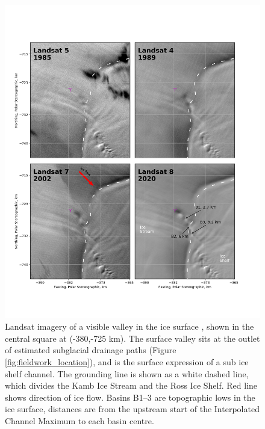 \begin{figure}[!ht]
\centering
\includegraphics[width=1\textwidth]{chapters/2/historic_channel.png}
\caption[Historic Landsat imagery]{Landsat imagery of a visible valley in the ice surface \citep{RoyLandsat8Scienceproduct2014}, shown in the central square at (-380,-725 km). The surface valley sits at the outlet of estimated subglacial drainage paths (Figure \ref{fig:fieldwork_location}), and is the surface expression of a sub ice shelf channel. The grounding line \citep{depoorter2013calving} is shown as a white dashed line, which divides the Kamb Ice Stream and the Ross Ice Shelf. Red line shows direction of ice flow. Basins B1--3 are topographic lows in the ice surface, distances are  from the upstream start of the Interpolated Channel Maximum to each basin centre.}
\label{fig:historic}
\end{figure}




